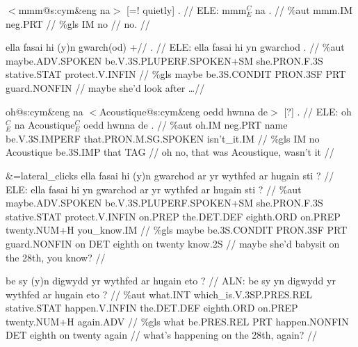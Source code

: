 \documentclass[a4paper,10pt]{article}
\begin{document}
\ex
\begingl[lingstyle=gergl]
\glchat $<$mmm@s:cym\&eng na$>$ [=! quietly] . //
\glsurface ELE:  mmm$^{C}_{E}$ na .  //
\glauto \%aut  mmm{\scriptsize .IM} neg{\scriptsize .PRT}   //
\glmanual \%gls  IM no   //
\gleng no. //
\endgl
\xe

\ex
\begingl[lingstyle=gergl]
\glchat ella fasai hi (y)n gwarch(od) +// . //
\glsurface ELE:  ella fasai hi yn gwarchod .  //
\glauto \%aut  maybe{\scriptsize .ADV.SPOKEN} be{\scriptsize .V.3S.PLUPERF.SPOKEN+SM} she{\scriptsize .PRON.F.3S} stative{\scriptsize .STAT} protect{\scriptsize .V.INFIN}   //
\glmanual \%gls  maybe be{\scriptsize .3S.CONDIT} PRON{\scriptsize .3SF} PRT guard{\scriptsize .NONFIN}   //
\gleng maybe she'd look after \dots  //
\endgl
\xe

\ex
\begingl[lingstyle=gergl]
\glchat oh@s:cym\&eng na $<$Acoustique@s:cym\&eng oedd hwnna de$>$ [?] . //
\glsurface ELE:  oh$^{C}_{E}$ na Acoustique$^{C}_{E}$ oedd hwnna de .  //
\glauto \%aut  oh{\scriptsize .IM} neg{\scriptsize .PRT} name be{\scriptsize .V.3S.IMPERF} that{\scriptsize .PRON.M.SG.SPOKEN} isn't\_it{\scriptsize .IM}   //
\glmanual \%gls  IM no Acoustique be{\scriptsize .3S.IMP} that TAG   //
\gleng oh no, that was Acoustique, wasn't it //
\endgl
\xe

\ex
\begingl[lingstyle=gergl]
\glchat \&=lateral\_clicks ella fasai hi (y)n gwarchod ar yr wythfed ar hugain sti ? //
\glsurface ELE:  ella fasai hi yn gwarchod ar yr wythfed ar hugain sti ?  //
\glauto \%aut  maybe{\scriptsize .ADV.SPOKEN} be{\scriptsize .V.3S.PLUPERF.SPOKEN+SM} she{\scriptsize .PRON.F.3S} stative{\scriptsize .STAT} protect{\scriptsize .V.INFIN} on{\scriptsize .PREP} the{\scriptsize .DET.DEF} eighth{\scriptsize .ORD} on{\scriptsize .PREP} twenty{\scriptsize .NUM+H} you\_know{\scriptsize .IM}   //
\glmanual \%gls  maybe be{\scriptsize .3S.CONDIT} PRON{\scriptsize .3SF} PRT guard{\scriptsize .NONFIN} on DET eighth on twenty know{\scriptsize .2S}   //
\gleng maybe she'd babysit on the 28th, you know? //
\endgl
\xe

\ex
\begingl[lingstyle=gergl]
\glchat be sy (y)n digwydd yr wythfed ar hugain eto ? //
\glsurface ALN:  be sy yn digwydd yr wythfed ar hugain eto ?  //
\glauto \%aut  what{\scriptsize .INT} which\_is{\scriptsize .V.3SP.PRES.REL} stative{\scriptsize .STAT} happen{\scriptsize .V.INFIN} the{\scriptsize .DET.DEF} eighth{\scriptsize .ORD} on{\scriptsize .PREP} twenty{\scriptsize .NUM+H} again{\scriptsize .ADV}   //
\glmanual \%gls  what be{\scriptsize .PRES.REL} PRT happen{\scriptsize .NONFIN} DET eighth on twenty again   //
\gleng what's happening on the 28th, again? //
\endgl
\xe
\end{document}
